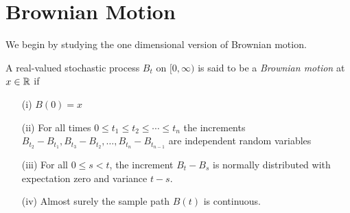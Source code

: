 \chapter{Brownian Motion}
We begin by studying the one dimensional version of Brownian motion.
\begin{defn}A real-valued stochastic process $B_t$ on $[0, \infty)$ is said to be a
  \emph{Brownian motion} at $x \in \mathbb{R}$ if 
\begin{itemize}
\item[(i)]$B(0) = x$
\item[(ii)]For all times $0 \leq t_1 \leq t_2 \leq \cdots \leq t_n$
  the increments $B_{t_2} - B_{t_1}, B_{t_3} - B_{t_2}, \dots, B_{t_n}
  - B_{t_{n-1}}$ are independent random variables
\item[(iii)]For all $0 \leq s < t$, the increment $B_t - B_s$ is normally distributed with
  expectation zero and variance $t - s$.
\item[(iv)]Almost surely the sample path $B(t)$ is continuous.
\end{itemize}
\end{defn}

